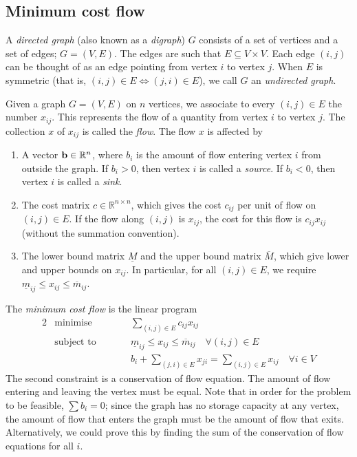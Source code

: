 \subsection{Minimum cost flow}
\begin{definition}
	A \textit{directed graph} (also known as a \textit{digraph}) \( G \) consists of a set of vertices and a set of edges; \( G = (V, E) \).
	The edges are such that \( E \subseteq V \times V \).
	Each edge \( (i,j) \) can be thought of as an edge pointing from vertex \( i \) to vertex \( j \).
	When \( E \) is symmetric (that is, \( (i,j) \in E \iff (j,i) \in E \)), we call \( G \) an \textit{undirected graph}.
\end{definition}
\begin{definition}
	Given a graph \( G = (V, E) \) on \( n \) vertices, we associate to every \( (i,j) \in E \) the number \( x_{ij} \).
	This represents the flow of a quantity from vertex \( i \) to vertex \( j \).
	The collection \( x \) of \( x_{ij} \) is called the \textit{flow}.
	The flow \( x \) is affected by
	\begin{enumerate}
		\item A vector \( \vb b \in \mathbb R^n \), where \( b_i \) is the amount of flow entering vertex \( i \) from outside the graph.
		      If \( b_i > 0 \), then vertex \( i \) is called a \textit{source}.
		      If \( b_i < 0 \), then vertex \( i \) is called a \textit{sink}.
		\item The cost matrix \( c \in \mathbb R^{n \times n} \), which gives the cost \( c_{ij} \) per unit of flow on \( (i,j) \in E \).
		      If the flow along \( (i,j) \) is \( x_{ij} \), the cost for this flow is \( c_{ij}x_{ij} \) (without the summation convention).
		\item The lower bound matrix \( \underline{M} \) and the upper bound matrix \( \overline{M} \), which give lower and upper bounds on \( x_{ij} \).
		      In particular, for all \( (i,j) \in E \), we require \( \underline m_{ij} \leq x_{ij} \leq \overline m_{ij} \).
	\end{enumerate}
\end{definition}
\begin{definition}
	The \textit{minimum cost flow} is the linear program
	\begin{alignat*}{2}
		 & \text{minimise}   & \qquad & \sum_{(i,j) \in E}c_{ij}x_{ij}                                                   \\
		 & \text{subject to} &        & \underline m_{ij} \leq x_{ij} \leq \overline m_{ij} \quad \forall (i,j) \in E    \\
		 &                   &        & b_i + \sum_{(j,i) \in E} x_{ji} = \sum_{(i,j)\in E} x_{ij} \quad \forall i \in V
	\end{alignat*}
	The second constraint is a conservation of flow equation.
	The amount of flow entering and leaving the vertex must be equal.
	Note that in order for the problem to be feasible, \( \sum b_i = 0 \); since the graph has no storage capacity at any vertex, the amount of flow that enters the graph must be the amount of flow that exits.
	Alternatively, we could prove this by finding the sum of the conservation of flow equations for all \( i \).
\end{definition}
